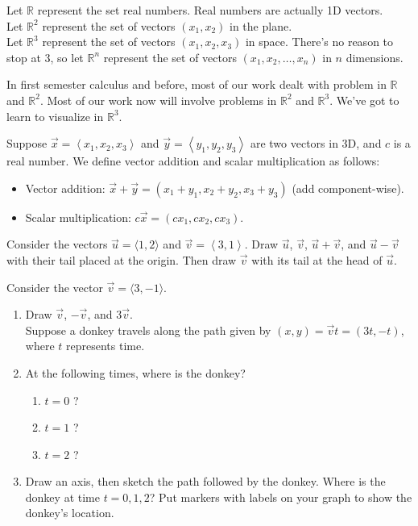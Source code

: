 \begin{definition}
Let $\mathbb{R}$ represent the set real numbers. Real numbers are actually 1D vectors.\\
Let $\mathbb{R}^2$ represent the set of vectors $(x_1,x_2)$ in the plane.\\
Let $\mathbb{R}^3$ represent the set of vectors $(x_1,x_2,x_3)$ in space. There's no reason to stop at 3, so let $\mathbb{R}^n$ represent the set of vectors $(x_1,x_2,\ldots,x_n)$ in $n$ dimensions.
\end{definition}
In first semester calculus and before, most of our work dealt with problem in $\mathbb{R}$ and $\mathbb{R}^2$. Most of our work now will involve problems in $\mathbb{R}^2$ and $\mathbb{R}^3$. We've got to learn to visualize in $\mathbb{R}^3$.

\begin{definition}\label{def:vecadd}
Suppose $\vec x=\left<x_1,x_2,x_3\right>$ and $\vec y=\left<y_1,y_2,y_3\right>$ are two vectors in 3D, and $c$ is a real number. We define vector addition and scalar multiplication as follows:
\begin{itemize}
\item Vector addition: $\vec x+\vec y = (x_1+y_1,x_2+y_2,x_3+y_3)$ (add component-wise).
\item Scalar multiplication: $c\vec x = (cx_1,cx_2,cx_3)$.
\end{itemize}
\end{definition}

\begin{problem}
Consider the vectors $\vec u=\langle 1,2 \rangle$ and $\vec v=\left<3,1\right>$.  Draw $\vec u$, $\vec v$, $\vec u+\vec v$, and $\vec u-\vec v$ with their tail placed at the origin.  Then draw $\vec v$ with its tail at the head of $\vec u$. 
\end{problem}

\begin{problem}\label{prob:donkey}
Consider the vector $\vec v=\langle 3,-1 \rangle $.\\
\begin{enumerate}
\item Draw $\vec v$, $-\vec v$, and $3\vec v$. \\
\noinent Suppose a donkey travels along the path given by $(x,y)=\vec v t = (3t,-t)$, where $t$ represents time.
\item At the following times, where is the donkey?
	\begin{enumerate}
		\item $t=0$ ?
		\item $t=1$ ?
		\item $t=2$ ?
	\end{enumerate}
\item Draw an axis, then sketch the path followed by the donkey. Where is the donkey at time $t=0,1,2$? Put markers with labels on your graph to show the donkey's location.
\end{enumerate}
\end{problem}

